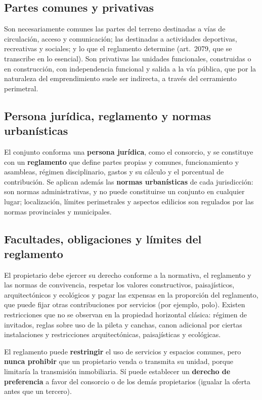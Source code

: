 \documentclass[12pt,oneside]{book}
\begin{document}
\subsection{Partes comunes y privativas}

Son necesariamente comunes las partes del terreno destinadas a vías de circulación, acceso y comunicación; las destinadas a actividades deportivas, recreativas y sociales; y lo que el reglamento determine (art.~2079, que se transcribe en lo esencial). Son privativas las unidades funcionales, construidas o en construcción, con independencia funcional y salida a la vía pública, que por la naturaleza del emprendimiento suele ser indirecta, a través del cerramiento perimetral.

\subsection{Persona jurídica, reglamento y normas urbanísticas}

El conjunto conforma una \textbf{persona jurídica}, como el consorcio, y se constituye con un \textbf{reglamento} que define partes propias y comunes, funcionamiento y asambleas, régimen disciplinario, gastos y su cálculo y el porcentual de contribución. Se aplican además las \textbf{normas urbanísticas} de cada jurisdicción: son normas administrativas, y no puede constituirse un conjunto en cualquier lugar; localización, límites perimetrales y aspectos edilicios son regulados por las normas provinciales y municipales.

\subsection{Facultades, obligaciones y límites del reglamento}

El propietario debe ejercer su derecho conforme a la normativa, el reglamento y las normas de convivencia, respetar los valores constructivos, paisajísticos, arquitectónicos y ecológicos y pagar las expensas en la proporción del reglamento, que puede fijar otras contribuciones por servicios (por ejemplo, polo). Existen restricciones que no se observan en la propiedad horizontal clásica: régimen de invitados, reglas sobre uso de la pileta y canchas, canon adicional por ciertas instalaciones y restricciones arquitectónicas, paisajísticas y ecológicas.

\begin{importante}
El reglamento puede \textbf{restringir} el uso de servicios y espacios comunes, pero \textbf{nunca prohibir} que un propietario venda o transmita su unidad, porque limitaría la transmisión inmobiliaria. Sí puede establecer un \textbf{derecho de preferencia} a favor del consorcio o de los demás propietarios (igualar la oferta antes que un tercero).
\end{importante}
\end{document}
